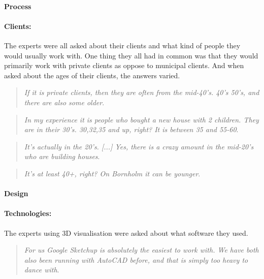 		\paragraph*{Process}
		
		\paragraph*{Clients:}
		The experts were all asked about their clients and what kind of people they would usually work with. One thing they all had in common was that they would primarily work with private clients as oppose to municipal clients. And when asked about the ages of their clients, the answers varied. 
		
		\begin{quote}
			\textit{If it is private clients, then they are often from the mid-40's. 40’s 50’s, and there are also some older}\label{def:expertQuote1}.\\
		\end{quote}
		
		\begin{quote}
			\textit{In my experience it is people who bought a new house with 2 children. They are in their 30's. 30,32,35 and up, right? It is between 35 and 55-60}\label{def:expertQuote2}.\\
		\end{quote}
	
		\begin{quote}
			\textit{It's actually in the 20's. [...] Yes, there is a crazy amount in the mid-20's who are building houses}\label{def:expertQuote3}.\\
		\end{quote}
		
		\begin{quote}
			\textit{It's at least 40+, right? On Bornholm it can be younger}\label{def:expertQuote4}.\\
		\end{quote}
		
		\paragraph*{Design}

		\paragraph*{Technologies:}
		The experts using 3D visualisation were asked about what software they used.
		\begin{quote}
			\textit{For us Google Sketchup is absolutely the easiest to work with. We have both also been running with AutoCAD before, and that is simply too heavy to dance with}\label{def:expertQuote5}.\\
		\end{quote}
		
